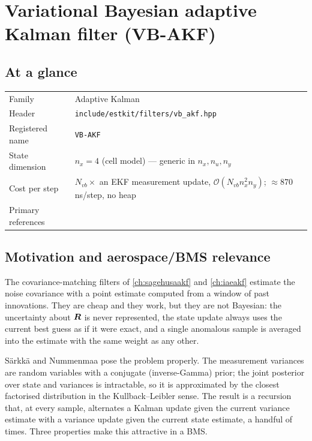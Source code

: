 \chapter{Variational Bayesian adaptive Kalman filter (VB-AKF)}
\label{ch:vbakf}

\section*{At a glance}
\begin{tabular}{@{}l>{\raggedright\arraybackslash}p{}@{}}
Family & Adaptive Kalman \\
Header & \texttt{include/estkit/filters/vb\_akf.hpp} \\
Registered name & \texttt{VB-AKF} \\
State dimension & $n_x = 4$ (cell model) --- generic in $n_x, n_u, n_y$ \\
Cost per step & $N_{vb}\times$ an EKF measurement update, $\mathcal{O}(N_{vb}n_x^2 n_y)$; $\approx 870$\,ns/step, no heap \\
Primary references & \cite{sarkka2009vb,sarkka2013,bishop2006prml,beal2003vb,jazwinski1970} \\
\end{tabular}

\section{Motivation and aerospace/BMS relevance}
The covariance-matching filters of \cref{ch:sagehusaakf} and \cref{ch:iaeakf} estimate the noise covariance
with a point estimate computed from a window of past innovations.  They are cheap and they work, but
they are not Bayesian: the uncertainty about $\bm{R}$ is never represented, the state update always
uses the current best guess as if it were exact, and a single anomalous sample is averaged into the
estimate with the same weight as any other.

Särkkä and Nummenmaa \cite{sarkka2009vb} pose the problem properly.  The measurement variances are
random variables with a conjugate (inverse-Gamma) prior; the joint posterior over state and
variances is intractable, so it is approximated by the closest factorised distribution in the
Kullback--Leibler sense.  The result is a recursion that, at every sample, alternates a Kalman
update given the current variance estimate with a variance update given the current state estimate,
a handful of times.  Three properties make this attractive in a BMS.

